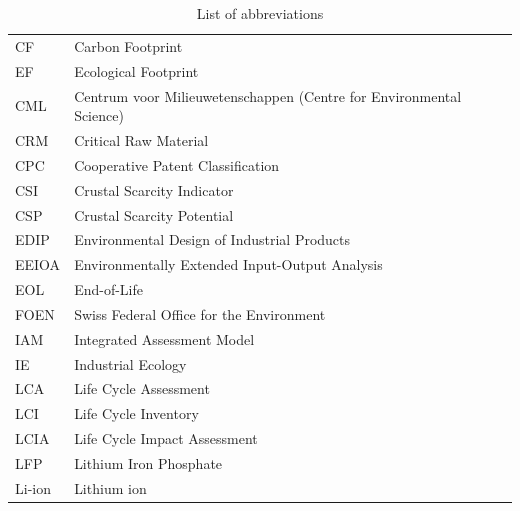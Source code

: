 \documentclass[review,3p,authoryear]{elsarticle}
\begin{document}
\begin{table}[H]
    \centering
    \caption{List of abbreviations}
    \label{tab:abbreviations}
    \begin{tabular}{ll}
        \toprule
        CF            & Carbon Footprint                                                    \\
        EF            & Ecological Footprint                                                \\
        CML           & Centrum voor Milieuwetenschappen (Centre for Environmental Science) \\
        CRM           & Critical Raw Material                                               \\
        CPC           & Cooperative Patent Classification                                   \\
        CSI           & Crustal Scarcity Indicator                                          \\
        CSP           & Crustal Scarcity Potential                                          \\
        EDIP          & Environmental Design of Industrial Products                         \\
        EEIOA         & Environmentally Extended Input-Output Analysis                      \\
        EOL           & End-of-Life                                                         \\
        FOEN          & Swiss Federal Office for the Environment                            \\
        IAM           & Integrated Assessment Model                                         \\
        IE            & Industrial Ecology                                                  \\
        LCA           & Life Cycle Assessment                                               \\
        LCI           & Life Cycle Inventory                                                \\
        LCIA          & Life Cycle Impact Assessment                                        \\
        LFP           & Lithium Iron Phosphate                                              \\
        Li-ion        & Lithium ion                                                         \\

\end{tabular}
\end{table}
\end{document}
